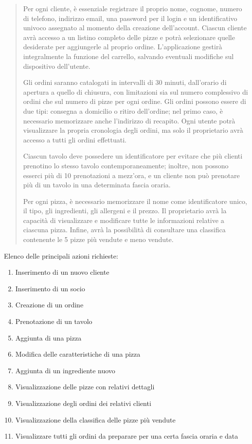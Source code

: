 \documentclass[a4paper,12pt, oneside]{article}
\begin{document}
\begin{quote}

Per ogni cliente, è essenziale registrare il proprio nome, cognome,
numero di telefono, indirizzo email, una password per il login e un
identificativo univoco assegnato al momento della creazione
dell'account. Ciascun cliente avrà accesso a un listino completo delle
pizze e potrà selezionare quelle desiderate per aggiungerle al proprio
ordine. L'applicazione gestirà integralmente la funzione del carrello,
salvando eventuali modifiche sul dispositivo dell'utente.

Gli ordini saranno catalogati in intervalli di 30 minuti,
dall'orario di apertura a quello di chiusura, con limitazioni sia sul
numero complessivo di ordini che sul numero di pizze per ogni ordine.
Gli ordini possono essere di due tipi: consegna a domicilio o ritiro
dell'ordine; nel primo caso, è necessario memorizzare anche
l'indirizzo di recapito. Ogni utente potrà visualizzare la propria
cronologia degli ordini, ma solo il proprietario avrà accesso a tutti
gli ordini effettuati.

Ciascun tavolo deve possedere un identificatore per evitare che più
clienti prenotino lo stesso tavolo contemporaneamente; inoltre, non
possono esserci più di 10 prenotazioni a mezz'ora, e un cliente non
può prenotare più di un tavolo in una determinata fascia oraria.

Per ogni pizza, è necessario memorizzare il nome come identificatore
unico, il tipo, gli ingredienti, gli allergeni e il prezzo. Il
proprietario avrà la capacità di visualizzare e modificare tutte le
informazioni relative a ciascuna pizza. Infine, avrà la possibilità
di consultare una classifica contenente le 5 pizze più vendute e
meno vendute.

\end{quote}

Elenco delle principali azioni richieste:
\begin{enumerate}
    \item Inserimento di un nuovo cliente
    \item Inserimento di un socio
    \item Creazione di un ordine
    \item Prenotazione di un tavolo
    \item Aggiunta di una pizza
    \item Modifica delle caratteristiche di una pizza
    \item Aggiunta di un ingrediente nuovo
    \item Visualizzazione delle pizze con relativi dettagli
    \item Visualizzazione degli ordini dei relativi clienti
    \item Visualizzazione della classifica delle pizze più vendute
    \item Visualizzare tutti gli ordini da preparare per una certa fascia oraria e data
\end{enumerate}
\end{document}
